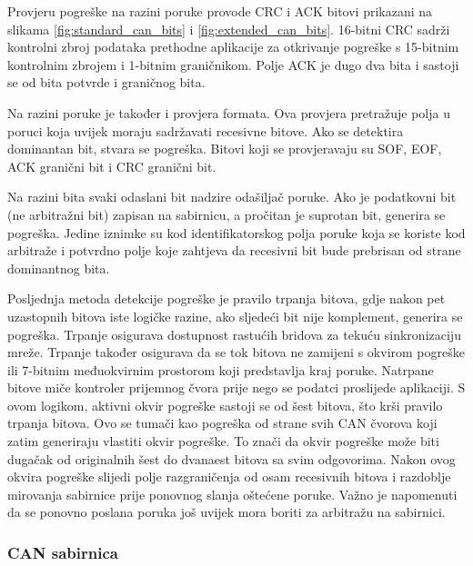 Provjeru pogreške na razini poruke provode CRC i ACK bitovi prikazani na slikama \ref{fig:standard_can_bits} i \ref{fig:extended_can_bits}. 16-bitni CRC sadrži kontrolni zbroj podataka prethodne aplikacije za otkrivanje pogreške s 15-bitnim kontrolnim zbrojem i 1-bitnim graničnikom. Polje ACK je dugo dva bita i sastoji se od bita potvrde i graničnog bita.

Na razini poruke je također i provjera formata. Ova provjera pretražuje polja u poruci koja uvijek moraju sadržavati recesivne bitove. Ako se detektira dominantan bit, stvara se pogreška. Bitovi koji se provjeravaju su SOF, EOF, ACK granični bit i CRC granični bit.

Na razini bita svaki odaslani bit nadzire odašiljač poruke. Ako je podatkovni bit (ne arbitražni bit) zapisan na sabirnicu, a pročitan je suprotan bit, generira se pogreška. Jedine iznimke su kod identifikatorskog polja poruke koja se koriste kod arbitraže i potvrdno polje koje zahtjeva da recesivni bit bude prebrisan od strane dominantnog bita.

Posljednja metoda detekcije pogreške je pravilo trpanja bitova, gdje nakon pet uzastopnih bitova iste logičke razine, ako sljedeći bit nije komplement, generira se pogreška. Trpanje osigurava dostupnost rastućih bridova za tekuću sinkronizaciju mreže. Trpanje također osigurava da se tok bitova ne zamijeni s okvirom pogreške ili 7-bitnim međuokvirnim prostorom koji predstavlja kraj poruke. Natrpane bitove miče kontroler prijemnog čvora prije nego se podatci proslijede aplikaciji. S ovom logikom, aktivni okvir pogreške sastoji se od šest bitova, što krši pravilo trpanja bitova. Ovo se tumači kao pogreška od strane svih CAN čvorova koji zatim generiraju vlastiti okvir pogreške. To znači da okvir pogreške može biti dugačak od originalnih šest do dvanaest bitova sa svim odgovorima. Nakon ovog okvira pogreške slijedi polje razgraničenja od osam recesivnih bitova i razdoblje mirovanja sabirnice prije ponovnog slanja oštećene poruke. Važno je napomenuti da se ponovno poslana poruka još uvijek mora boriti za arbitražu na sabirnici.

\subsubsection{CAN sabirnica}

